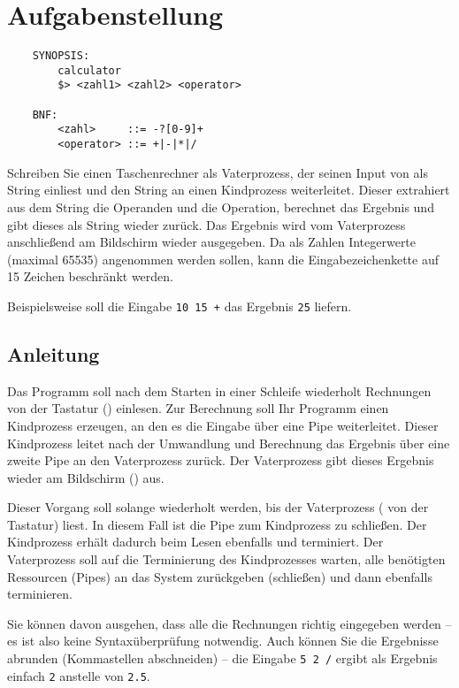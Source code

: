 




\section*{Aufgabenstellung}

\begin{verbatim}
    SYNOPSIS:
        calculator
        $> <zahl1> <zahl2> <operator>

    BNF:
        <zahl>     ::= -?[0-9]+
        <operator> ::= +|-|*|/
\end{verbatim}

Schreiben Sie einen Taschenrechner als Vaterprozess, der seinen Input
von  als String einliest und den String an einen
Kindprozess weiterleitet. Dieser extrahiert aus dem String die
Operanden und die Operation, berechnet das Ergebnis und gibt dieses
als String wieder zurück. Das Ergebnis wird vom Vaterprozess
anschließend am Bildschirm wieder ausgegeben. Da als Zahlen
Integerwerte (maximal 65535) angenommen werden sollen, kann die
Eingabezeichenkette auf 15 Zeichen beschränkt werden.

Beispielsweise soll die Eingabe \verb_10 15 +_ das Ergebnis \verb_25_
liefern.

\subsection*{Anleitung}

Das Programm soll nach dem Starten in einer Schleife wiederholt
Rechnungen von der Tastatur () einlesen. Zur
Berechnung soll Ihr Programm einen Kindprozess erzeugen, an den
es die Eingabe über eine Pipe weiterleitet. Dieser Kindprozess
leitet nach der Umwandlung und Berechnung das Ergebnis über eine
zweite Pipe an den Vaterprozess zurück. Der Vaterprozess
gibt dieses Ergebnis wieder am Bildschirm () aus.

Dieser Vorgang soll solange wiederholt werden, bis der Vaterprozess
 ( von der Tastatur) liest.
In diesem Fall ist die Pipe zum Kindprozess zu schließen. Der
Kindprozess erhält dadurch beim Lesen ebenfalls 
und terminiert. Der Vaterprozess soll auf die Terminierung des
Kindprozesses warten, alle benötigten Ressourcen (Pipes) an das
System zurückgeben (schließen) und dann ebenfalls terminieren.

Sie können davon ausgehen, dass alle die Rechnungen richtig eingegeben
werden -- es ist also keine Syntaxüberprüfung notwendig. Auch können
Sie die Ergebnisse abrunden (Kommastellen abschneiden) -- die Eingabe
\verb_5 2 /_ ergibt als Ergebnis einfach \verb_2_ anstelle von
\verb_2.5_.

\osueguidelinestwo


